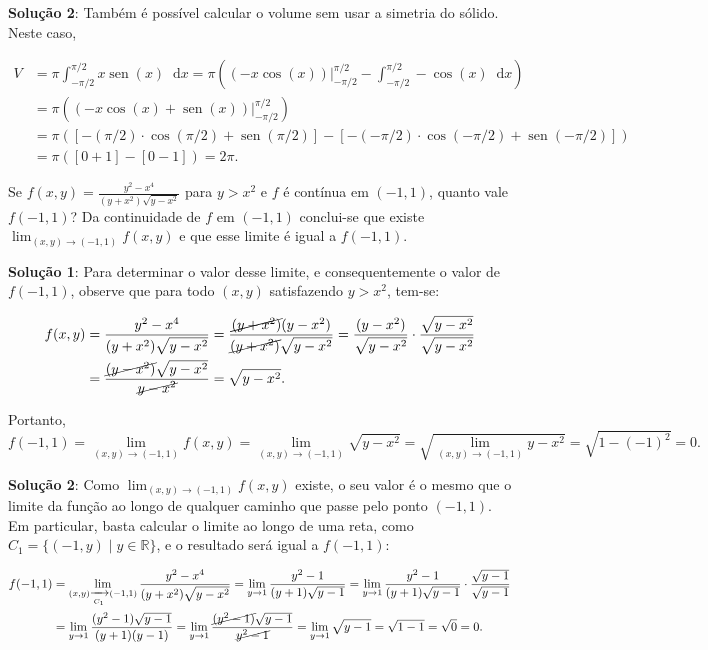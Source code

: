 \documentclass[12pt,a4paper]{article}
\newcommand*\diff{\mathop{}\!\mathrm{d}}
\newcommand*\sen{\operatorname{sen}}
\begin{document}
\begin{ExerciseList}
\textbf{Solução 2}: Também é possível calcular o volume sem usar a simetria do sólido. Neste caso,

\begin{align*}
    V & = \pi \int_{-\pi/2}^{\pi/2} x \sen(x) \diff{x}
        = \pi \left(\left(- x \cos(x) \right)\bigg\rvert_{-\pi/2}^{\pi/2} - \int_{-\pi/2}^{\pi/2} -\cos(x) \diff{x}\right) \\
      & = \pi \left(\left(- x \cos(x) + \sen(x) \right)\bigg\rvert_{-\pi/2}^{\pi/2}\right) \\
      & = \pi \left(\left[- (\pi/2) \cdot \cos(\pi/2) + \sen(\pi/2) \right] - \left[-(-\pi/2) \cdot \cos(-\pi/2) + \sen(-\pi/2) \right]\right) \\
      & = \pi \left([0 + 1] - [0 - 1 ]\right) = 2\pi.
\end{align*}


\Exercise[title={2,0}] Se $f(x,y) = \frac{y^2-x^4}{(y+x^2)\sqrt{y-x^2}}$ para $y > x^2$ e $f$ é contínua em $(-1, 1)$, quanto vale $f(-1, 1)$?
\Answer Da continuidade de $f$ em $(-1, 1)$ conclui-se que existe $\lim_{(x, y)\to (-1, 1)} f(x,y)$ e que esse limite é igual a $f(-1, 1)$.

\textbf{Solução 1}: Para determinar o valor desse limite, e consequentemente o valor de $f(-1, 1)$, observe que para todo $(x, y)$ satisfazendo $y > x^2$, tem-se:

\begin{align*}
f(x, y)
& = \frac{y^2-x^4}{(y+x^2)\sqrt{y-x^2}}
    = \frac{\cancel{(y+x^2)}(y-x^2)}{\cancel{(y+x^2)}\sqrt{y-x^2}}
    = \frac{(y-x^2)}{\sqrt{y-x^2}}\cdot\frac{\sqrt{y-x^2}}{\sqrt{y-x^2}} \\
& = \frac{\cancel{(y-x^2)} \sqrt{y-x^2}}{\cancel{y-x^2}}
    = \sqrt{y-x^2}.
\end{align*}

Portanto,
\[
  f(-1, 1)
  = \lim_{(x, y)\to (-1, 1)} f(x,y)
  = \lim_{(x, y)\to (-1, 1)} \sqrt{y-x^2}
  = \sqrt{\lim_{(x, y)\to (-1, 1)} y-x^2}
  = \sqrt{1-(-1)^2}
  = 0.
\]

\textbf{Solução 2}: Como $\lim_{(x, y)\to (-1, 1)} f(x,y)$ existe, o seu valor é o mesmo que o limite da função ao longo de qualquer caminho que passe pelo ponto $(-1, 1)$. Em particular, basta calcular o limite ao longo de uma reta, como $C_1 = \{(-1, y)\mid y \in \mathbb{R} \}$, e o resultado será igual a $f(-1, 1)$:

\begin{align*}
f(-1, 1)
& = \lim_{(x, y) \xrightarrow[C_1]{} (-1, 1)} \frac{y^2-x^4}{(y+x^2)\sqrt{y-x^2}}
  = \lim_{y\to 1} \frac{y^2-1}{(y+1)\sqrt{y-1}}
  = \lim_{y\to 1} \frac{y^2-1}{(y+1)\sqrt{y-1}} \cdot \frac{\sqrt{y-1}}{\sqrt{y-1}} \\
& = \lim_{y\to 1} \frac{(y^2-1)\sqrt{y-1}}{(y+1)(y-1)}
  = \lim_{y\to 1} \frac{\cancel{(y^2-1)}\sqrt{y-1}}{\cancel{y^2-1}}
  = \lim_{y\to 1} \sqrt{y-1}
  = \sqrt{1-1}
  = \sqrt{0}
  = 0.
\end{align*}


\end{ExerciseList}
\end{document}
